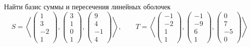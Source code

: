 Найти базис суммы и пересечения линейных оболочек
$$ S = \left\langle
\begin{pmatrix}
	1 \\
    3 \\
    -2 \\
    1
\end{pmatrix},
\begin{pmatrix}
	3 \\
    1 \\
    0 \\
    1
\end{pmatrix},
\begin{pmatrix}
	9 \\
    4 \\
    -1 \\
    4
\end{pmatrix} \right\rangle, \qquad T = \left\langle
\begin{pmatrix}
	-1 \\
    -2 \\
    1 \\
    1
\end{pmatrix},
\begin{pmatrix}
	-1 \\
    -9 \\
    6 \\
    1
\end{pmatrix},
\begin{pmatrix}
	0 \\
    7 \\
    -5 \\
    0
\end{pmatrix} \right\rangle $$
